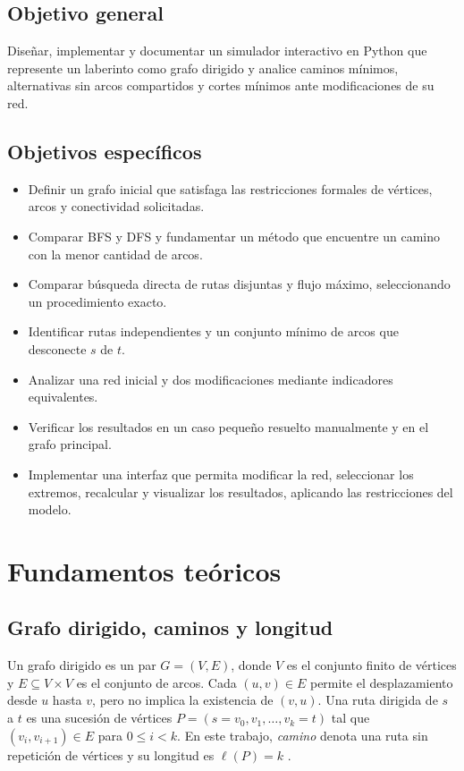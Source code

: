 \documentclass[11pt,a4paper]{article}
\begin{document}
\subsection{Objetivo general}
Diseñar, implementar y documentar un simulador interactivo en Python que represente un laberinto como grafo dirigido y analice caminos mínimos, alternativas sin arcos compartidos y cortes mínimos ante modificaciones de su red.

\subsection{Objetivos específicos}
\begin{itemize}[leftmargin=1.7em]
\item Definir un grafo inicial que satisfaga las restricciones formales de vértices, arcos y conectividad solicitadas.
\item Comparar BFS y DFS y fundamentar un método que encuentre un camino con la menor cantidad de arcos.
\item Comparar búsqueda directa de rutas disjuntas y flujo máximo, seleccionando un procedimiento exacto.
\item Identificar rutas independientes y un conjunto mínimo de arcos que desconecte $s$ de $t$.
\item Analizar una red inicial y dos modificaciones mediante indicadores equivalentes.
\item Verificar los resultados en un caso pequeño resuelto manualmente y en el grafo principal.
\item Implementar una interfaz que permita modificar la red, seleccionar los extremos, recalcular y visualizar los resultados, aplicando las restricciones del modelo.
\end{itemize}

\section{Fundamentos teóricos}
\subsection{Grafo dirigido, caminos y longitud}
Un grafo dirigido es un par $G=(V,E)$, donde $V$ es el conjunto finito de vértices y $E\subseteq V\times V$ es el conjunto de arcos. Cada $(u,v)\in E$ permite el desplazamiento desde $u$ hasta $v$, pero no implica la existencia de $(v,u)$. Una ruta dirigida de $s$ a $t$ es una sucesión de vértices $P=(s=v_0,v_1,\ldots,v_k=t)$ tal que $(v_i,v_{i+1})\in E$ para $0\leq i<k$. En este trabajo, \emph{camino} denota una ruta sin repetición de vértices y su longitud es $\ell(P)=k$ \cite{kleinberg2006,sedgewick2011}.
\end{document}
